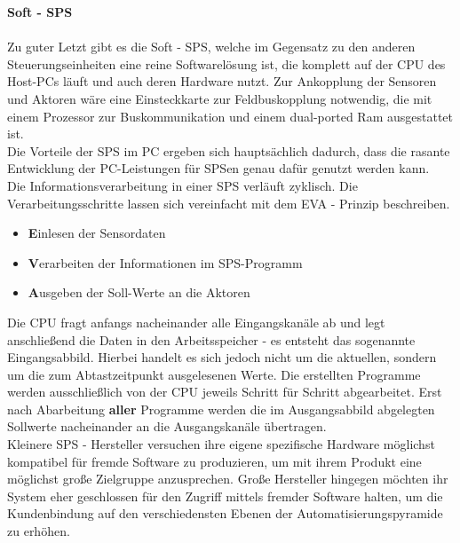 	\textbf{Soft - SPS}\\\\
	Zu guter Letzt gibt es die Soft - SPS, welche im Gegensatz zu den anderen Steuerungseinheiten eine reine Softwarelösung ist, die komplett auf der CPU des Host-PCs läuft und auch deren Hardware nutzt. Zur Ankopplung der Sensoren und Aktoren wäre eine Einsteckkarte zur Feldbuskopplung notwendig, die mit einem Prozessor zur Buskommunikation und einem dual-ported Ram ausgestattet ist.\\
	
	Die Vorteile der SPS im PC ergeben sich hauptsächlich dadurch, dass die rasante Entwicklung der PC-Leistungen für SPSen genau dafür genutzt werden kann.\\
	
	Die Informationsverarbeitung in einer SPS verläuft zyklisch. Die Verarbeitungsschritte lassen sich vereinfacht mit dem EVA - Prinzip beschreiben.
	
	\begin{itemize}
		\item \textbf{E}inlesen der Sensordaten
		\item \textbf{V}erarbeiten der Informationen im SPS-Programm
		\item \textbf{A}usgeben der Soll-Werte an die Aktoren
	\end{itemize}
	
	Die CPU fragt anfangs nacheinander alle Eingangskanäle ab und legt anschließend die Daten in den Arbeitsspeicher - es entsteht das sogenannte \glqq Eingangsabbild\grqq. Hierbei handelt es sich jedoch nicht um die aktuellen, sondern um die zum Abtastzeitpunkt ausgelesenen Werte. Die erstellten Programme werden ausschließlich von der CPU jeweils Schritt für Schritt abgearbeitet. Erst nach Abarbeitung \textbf{aller} Programme werden die im Ausgangsabbild abgelegten Sollwerte nacheinander an die Ausgangskanäle übertragen. \cite{mseitz_sps} \\ 
	
	Kleinere SPS - Hersteller versuchen ihre eigene spezifische Hardware möglichst kompatibel für fremde Software zu produzieren, um mit ihrem Produkt eine möglichst große Zielgruppe anzusprechen. Große Hersteller hingegen möchten ihr System eher geschlossen für den Zugriff mittels fremder Software halten, um die Kundenbindung auf den verschiedensten Ebenen der Automatisierungspyramide zu erhöhen.
	
